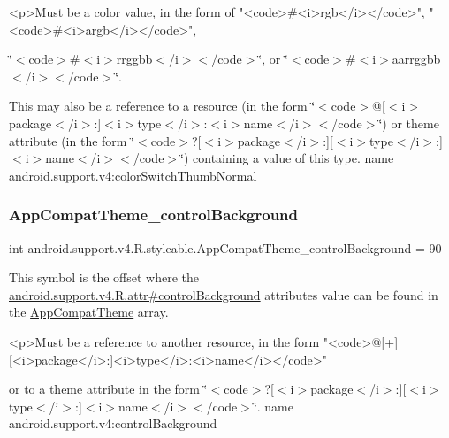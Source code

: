 \begin{DoxyVerb}      <p>Must be a color value, in the form of "<code>#<i>rgb</i></code>", "<code>#<i>argb</i></code>",
\end{DoxyVerb}
 \char`\"{}$<$code$>$\#$<$i$>$rrggbb$<$/i$>$$<$/code$>$\char`\"{}, or \char`\"{}$<$code$>$\#$<$i$>$aarrggbb$<$/i$>$$<$/code$>$\char`\"{}. 

This may also be a reference to a resource (in the form \char`\"{}$<$code$>$@\mbox{[}$<$i$>$package$<$/i$>$\+:\mbox{]}$<$i$>$type$<$/i$>$\+:$<$i$>$name$<$/i$>$$<$/code$>$\char`\"{}) or theme attribute (in the form \char`\"{}$<$code$>$?\mbox{[}$<$i$>$package$<$/i$>$\+:\mbox{]}\mbox{[}$<$i$>$type$<$/i$>$\+:\mbox{]}$<$i$>$name$<$/i$>$$<$/code$>$\char`\"{}) containing a value of this type.  name android.\+support.\+v4\+:color\+Switch\+Thumb\+Normal \mbox{\label{classandroid_1_1support_1_1v4_1_1R_1_1styleable_a69fdd6182b11eb1697d971b62e02f11b}} 
\subsubsection{\texorpdfstring{App\+Compat\+Theme\+\_\+control\+Background}{AppCompatTheme\_controlBackground}}
{\footnotesize\ttfamily int android.\+support.\+v4.\+R.\+styleable.\+App\+Compat\+Theme\+\_\+control\+Background = 90\hspace{0.3cm}{\ttfamily [static]}}

This symbol is the offset where the \hyperlink{classandroid_1_1support_1_1v4_1_1R_1_1attr_aed7c85a829b27222bdb9dec6505a706f}{android.\+support.\+v4.\+R.\+attr\#control\+Background} attribute\textquotesingle{}s value can be found in the \hyperlink{classandroid_1_1support_1_1v4_1_1R_1_1styleable_ac07ebbe62ed977f6dcaadc6397840ace}{App\+Compat\+Theme} array.

\begin{DoxyVerb}      <p>Must be a reference to another resource, in the form "<code>@[+][<i>package</i>:]<i>type</i>:<i>name</i></code>"
\end{DoxyVerb}
 or to a theme attribute in the form \char`\"{}$<$code$>$?\mbox{[}$<$i$>$package$<$/i$>$\+:\mbox{]}\mbox{[}$<$i$>$type$<$/i$>$\+:\mbox{]}$<$i$>$name$<$/i$>$$<$/code$>$\char`\"{}.  name android.\+support.\+v4\+:control\+Background \mbox{\label{classandroid_1_1support_1_1v4_1_1R_1_1styleable_a43f2be5deff68402fef3dcc0311e5255}} 
